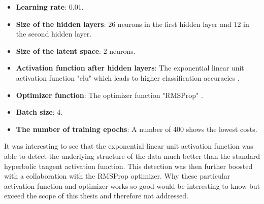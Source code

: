 \documentclass[MGS,Master,english]{twbook}%
\begin{document}
\begin{itemize}
	\item \textbf{Learning rate}: 0.01.
	\item \textbf{Size of the hidden layers}: 26 neurons in the first hidden layer and 12 in the second hidden layer.
	\item \textbf{Size of the latent space}: 2 neurons.
	\item \textbf{Activation function after hidden layers}: The exponential linear unit activation function "elu" which leads to higher classification accuracies \cite{ml::activation::elu}.
	\item \textbf{Optimizer function}: The optimizer function "RMSProp" \cite{ml::optimizer::overview}.
	\item \textbf{Batch size}: 4.
	\item \textbf{The number of training epochs}: A number of 400 shows the lowest costs. 
\end{itemize}
It was interesting to see that the exponential linear unit activation function was able to detect the underlying structure of the data much better than the standard hyperbolic tangent activation function. This detection was then further boosted with a collaboration with the RMSProp optimizer. Why these particular activation function and optimizer works so good would be interesting to know but exceed the scope of this thesis and therefore not addressed.
\end{document}
